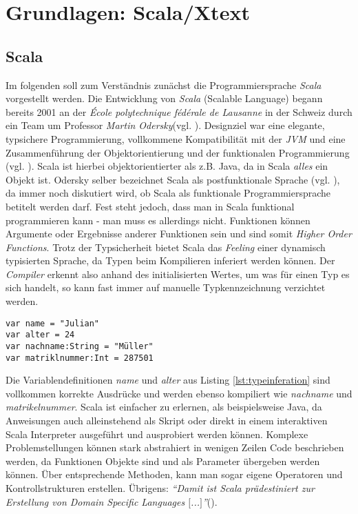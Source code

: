 \chapter{Grundlagen: Scala/Xtext}
\section{Scala}
Im folgenden soll zum Verständnis zunächst die Programmiersprache \textit{Scala} vorgestellt werden.
Die Entwicklung von \textit{Scala} (Scalable Language) begann bereits 2001 an der\textit{ École polytechnique fédérale de Lausanne} in der Schweiz durch ein Team um Professor \textit{Martin Odersky}(vgl. ). Designziel war eine elegante, typsichere Programmierung, vollkommene Kompatibilität mit der \textit{JVM} und eine Zusammenführung der Objektorientierung und der funktionalen Programmierung (vgl. ). Scala ist hierbei objektorientierter als z.B. Java, da in Scala \textit{alles} ein Objekt ist. Odersky selber bezeichnet Scala als postfunktionale Sprache (vgl. ), da immer noch diskutiert wird, ob Scala als funktionale Programmiersprache betitelt werden darf. Fest steht jedoch, dass man in Scala funktional programmieren kann - man muss es allerdings nicht. Funktionen können Argumente oder Ergebnisse anderer Funktionen sein und sind somit \textit{Higher Order Functions}. Trotz der Typsicherheit bietet Scala das \textit{Feeling} einer dynamisch typisierten Sprache, da Typen beim Kompilieren inferiert werden können. Der \textit{Compiler} erkennt also anhand des initialisierten Wertes, um was für einen Typ es sich handelt, so kann fast immer auf manuelle Typkennzeichnung verzichtet werden.
\begin{lstlisting}[style = scala, caption = {Beispielhafte Varablendefinition mit Typinferierung und manueller Typangabe}, label = {lst:typeinferation}]
var name = "Julian"
var alter = 24
var nachname:String = "Müller"
var matriklnummer:Int = 287501
\end{lstlisting}
Die Variablendefinitionen \textit{name} und \textit{alter} aus Listing \ref{lst:typeinferation} sind vollkommen korrekte Ausdrücke und werden ebenso kompiliert wie \textit{nachname} und \textit{matrikelnummer}.
Scala ist einfacher zu erlernen, als beispielsweise Java, da Anweisungen auch alleinstehend als Skript oder direkt in einem interaktiven Scala Interpreter ausgeführt und ausprobiert werden können. 
Komplexe Problemstellungen können stark abstrahiert in wenigen Zeilen Code beschrieben werden, da Funktionen Objekte sind und als Parameter übergeben werden können. Über entsprechende Methoden, kann man sogar eigene Operatoren und Kontrollstrukturen erstellen. Übrigens: \textit{"`Damit ist Scala prädestiniert zur Erstellung von Domain Specific Languages $[$...$]$"'}().
